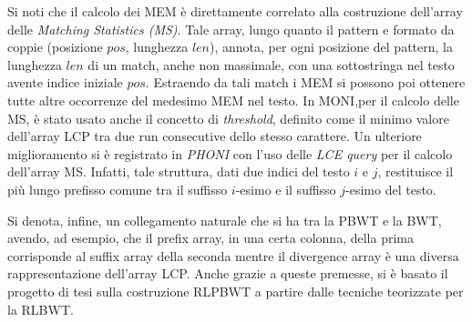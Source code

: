 \documentclass[a4paper,11pt, oneside,italian]{article}
\begin{document}
Si noti che il calcolo dei MEM è direttamente
correlato alla costruzione dell'array delle \textit{Matching Statistics (MS)}.
Tale array, lungo quanto il pattern e formato da coppie (posizione $pos$,
lunghezza $len$), annota, per ogni posizione del pattern, la lunghezza $len$ di
un match, anche non massimale, con una sottostringa nel testo avente
indice iniziale $pos$. Estraendo da tali match i MEM si possono poi ottenere
tutte altre occorrenze del medesimo MEM nel testo. 
In MONI,per il calcolo delle MS, è stato
usato anche il concetto di \textit{threshold}, definito come
il minimo valore dell'array LCP tra due run consecutive dello stesso
carattere. Un ulteriore miglioramento si è registrato in \textit{PHONI} con
l'uso delle \textit{LCE query} per il calcolo dell'array MS. Infatti, tale
struttura, dati due indici del testo $i$ e $j$, restituisce il più lungo
prefisso comune tra il suffisso $i$-esimo e il suffisso $j$-esimo del testo.

Si denota, infine, un collegamento naturale che si ha tra la PBWT
e la BWT, avendo, ad esempio, che il prefix array, in una certa colonna, della
prima corrisponde al suffix array della seconda mentre il divergence array è una
diversa rappresentazione dell'array LCP. Anche grazie a queste premesse, si è
basato il progetto di tesi sulla costruzione RLPBWT a partire dalle tecniche
teorizzate per la RLBWT.

\end{document}
